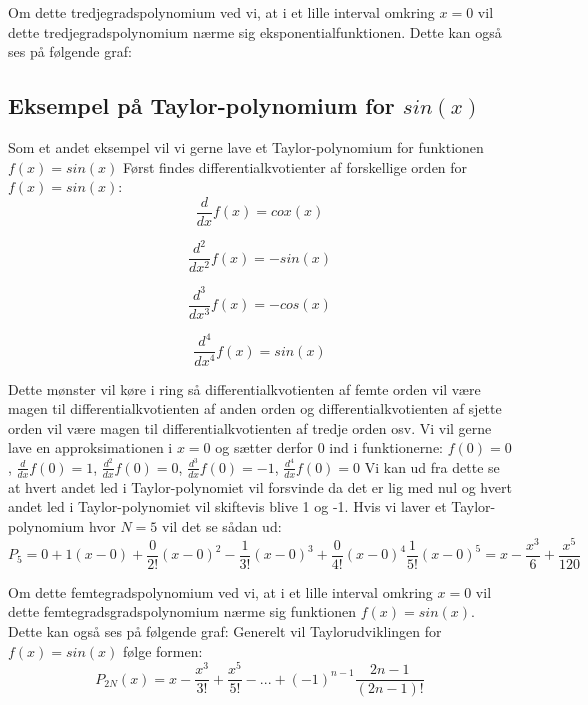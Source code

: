 Om dette tredjegradspolynomium ved vi, at i et lille interval omkring $x=0$ vil dette tredjegradspolynomium nærme sig eksponentialfunktionen. Dette kan også ses på følgende graf:

\subsection*{Eksempel på Taylor-polynomium for $sin(x)$}
Som et andet eksempel vil vi gerne lave et Taylor-polynomium for funktionen $f(x)=sin(x)$ Først findes differentialkvotienter af forskellige orden for $f(x)=sin(x)$:
\[
\frac{d}{dx}f(x)=cox(x)       
\]

\[
\frac{d^2}{dx^2}f(x)=-sin(x)
\]

\[
\frac{d^3}{dx^3}f(x)=-cos(x)
\]

\[
\frac{d^4}{dx^4}f(x)=sin(x)
\]

Dette mønster vil køre i ring så differentialkvotienten af femte orden vil være magen til differentialkvotienten af anden orden og differentialkvotienten af sjette orden vil være magen til differentialkvotienten af tredje orden osv. Vi vil gerne lave en approksimationen i $x=0$ og sætter derfor 0 ind i funktionerne:
$f(0)=0$, $\frac{d}{dx}f(0)=1$,  $\frac{d^2}{dx}f(0)=0$,                     $\frac{d^3}{dx}f(0)=-1$,    $\frac{d^4}{dx}f(0)=0$
Vi kan ud fra dette se at hvert andet led i Taylor-polynomiet vil forsvinde da det er lig med nul og hvert andet led i Taylor-polynomiet vil skiftevis blive 1 og -1. Hvis vi laver et Taylor-polynomium hvor $N=5$ vil det se sådan ud:
\[
P_5=0+1(x-0)+\frac{0}{2!}(x-0)^2-\frac{1}{3!}(x-0)^3+\frac{0}{4!}(x-0)^4\frac{1}{5!}(x-0)^5=x-\frac{x^3}{6}+\frac{x^5}{120}
\]

Om dette femtegradspolynomium ved vi, at i et lille interval omkring $x=0$ vil dette femtegradsgradspolynomium nærme sig funktionen $f(x)=sin(x)$. Dette kan også ses på følgende graf:
Generelt vil Taylorudviklingen for $f(x)=sin(x)$ følge formen:
\[
P_{2N}(x)=x-\frac{x^3}{3!}+\frac{x^5}{5!}-...+(-1)^{n-1}\frac{2n-1}{(2n-1)!}
\]


